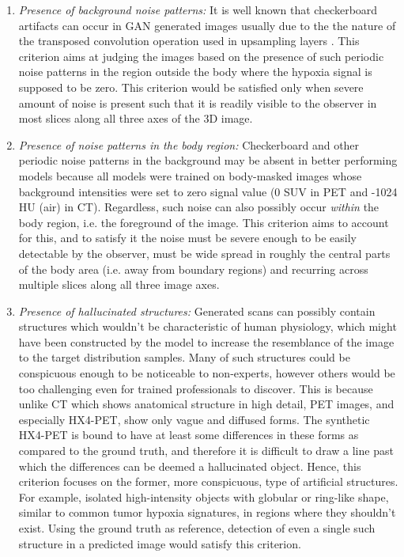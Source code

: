 \begin{enumerate}
    \item \textit{Presence of background noise patterns:} It is well known that checkerboard artifacts can occur in GAN generated images usually due to the the nature of the transposed convolution operation used in upsampling layers \cite{odena2016deconvolution}. This criterion aims at judging the images based on the presence of such periodic noise patterns in the region outside the body where the hypoxia signal is supposed to be zero. This criterion would be satisfied only when severe amount of noise is present such that it is readily visible to the observer in most slices along all three axes of the 3D image.
    
    \item \textit{Presence of noise patterns in the body region:} Checkerboard and other periodic noise patterns in the background may be absent in better performing models because all models were trained on body-masked images whose background intensities were set to zero signal value (0 SUV in PET and -1024 HU (air) in CT). Regardless, such noise can also possibly occur \textit{within} the body region, i.e. the foreground of the image. This criterion aims to account for this, and to satisfy it the noise must be severe enough to be easily detectable by the observer, must be wide spread in roughly the central parts of the body area (i.e. away from boundary regions) and recurring across multiple slices along all three image axes. 
    
    \item \textit{Presence of hallucinated structures:} Generated scans can possibly contain structures which wouldn't be characteristic of human physiology, which might have been constructed by the model to increase the resemblance of the image to the target distribution samples. Many of such structures could be conspicuous enough to be noticeable to non-experts, however others would be too challenging even for trained professionals to discover. This is because unlike CT which shows anatomical structure in high detail, PET images, and especially HX4-PET, show only vague and diffused forms. The synthetic HX4-PET is bound to have at least some differences in these forms as compared to the ground truth, and therefore it is difficult to draw a line past which the differences can be deemed a hallucinated object. Hence, this criterion focuses on the former, more conspicuous, type of artificial structures. For example, isolated high-intensity objects with globular or ring-like shape, similar to common tumor hypoxia signatures, in regions where they shouldn't exist. Using the ground truth as reference, detection of even a single such structure in a predicted image would satisfy this criterion.
    

\end{enumerate}
